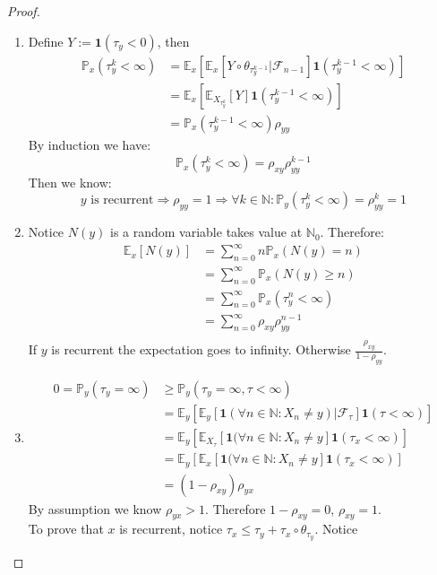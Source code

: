 \documentclass[a4paper,11pt]{book}
\theoremstyle{definition}
\theoremstyle{remark}
\begin{document}
 \begin{proof}\quad
 \begin{enumerate}
 	\item Define $Y:= \textbf{1}(\tau_y < 0)$, then
 	\begin{align*}
 		\mathbb{P}_x(\tau_y^k < \infty) &= \mathbb{E}_x[ \mathbb{E}_x[Y\circ\theta_{\tau^{k-1}_y}|\mathcal{F}_{n-1}]\textbf{1}(\tau_y^{k-1}< \infty)]\\
 		&= \mathbb{E}_x[\mathbb{E}_{X_{\tau_y^k}}[Y]\textbf{1}(\tau_y^{k-1} < \infty)]\\
 		&= \mathbb{P}_x(\tau_y^{k-1} < \infty)\rho_{yy}
 	\end{align*}
 	By induction we have:
 	\begin{equation*}
 		\mathbb{P}_x(\tau_y^{k}< \infty) = \rho_{xy} \rho_{yy}^{k-1}
 	\end{equation*}
 	Then we know:
 	\begin{equation*}
 		\text{$y$ is recurrent} \Rightarrow \rho_{yy} = 1 \Rightarrow \forall k \in \mathbb{N}: \mathbb{P}_y(\tau_y^k < \infty) = \rho_{yy}^k = 1
 	\end{equation*}
 	
 	\item Notice $N(y)$ is a random variable takes value at $\mathbb{N}_0$. Therefore:
 	\begin{align*}
 		\mathbb{E}_x[N(y)] &= \sum_{n = 0}^\infty n \mathbb{P}_x(N(y) = n)\\
 		&= \sum_{n = 0}^\infty \mathbb{P}_x(N(y) \geq n)\\
 		&= \sum_{n = 0}^\infty \mathbb{P}_x(\tau_y^n < \infty)\\
 		&= \sum_{n = 0}^\infty \rho_{xy}\rho_{yy}^{n-1}\\
 	\end{align*}
 	If $y$ is recurrent the expectation goes to infinity. Otherwise $\frac{\rho_{xy}}{1-\rho_{yy}}$.
 	
 	\item 
 	\begin{align*}
 		0 = \mathbb{P}_y(\tau_y = \infty) &\geq \mathbb{P}_y(\tau_y = \infty, \tau < \infty)\\
 		&= \mathbb{E}_y[\mathbb{E}_y[\textbf{1}(\forall n \in \mathbb{N}: X_n \neq y) | \mathcal{F_\tau}] \textbf{1}(\tau < \infty)]\\
 		&= \mathbb{E}_y[\mathbb{E}_{X_\tau}[\textbf{1}(\forall n \in \mathbb{N}: X_n \neq y]\textbf{1}(\tau_x < \infty)]\\
 		&= \mathbb{E}_y[\mathbb{E}_x[\textbf{1}(\forall n \in \mathbb{N}: X_n \neq y]\textbf{1}(\tau_x < \infty)]\\
 		&= (1- \rho_{xy})\rho_{yx}
 	\end{align*}
 	By assumption we know $\rho_{yx} > 1$. Therefore $1 - \rho_{xy} = 0$, $\rho_{xy} = 1$.\\
 	To prove that $x$ is recurrent, notice $\tau_x \leq \tau_y + \tau_x \circ \theta_{\tau_y}$. Notice
 \end{enumerate}
 \end{proof}
 
\end{document}
